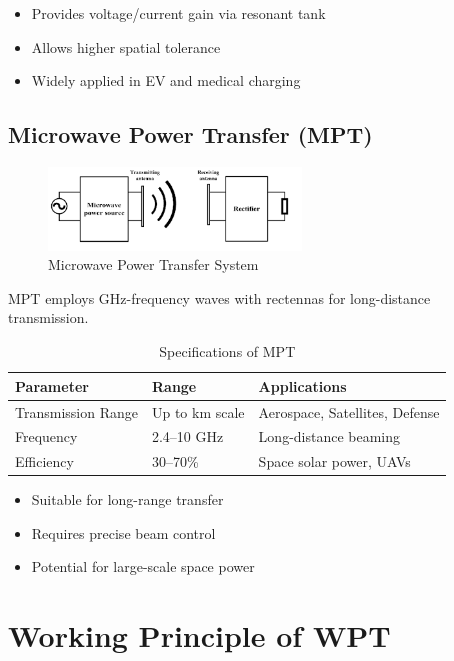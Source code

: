 \documentclass[12pt,a4paper]{report}
\begin{document}
\begin{itemize}
    \item Provides voltage/current gain via resonant tank
    \item Allows higher spatial tolerance
    \item Widely applied in EV and medical charging
\end{itemize}

\subsection{Microwave Power Transfer (MPT)}
\begin{figure}[H]
    \centering
    \includegraphics[width=0.6\textwidth]{image3.png}
    \caption{Microwave Power Transfer System}
\end{figure}

MPT employs GHz-frequency waves with rectennas for long-distance transmission.\cite{zhou2025lowpower}

\begin{table}[H]
\centering
\caption{Specifications of MPT}
\begin{tabular}{|p{4cm}|p{5cm}|p{5.2cm}|}
\hline
\textbf{Parameter} & \textbf{Range} & \textbf{Applications} \\
\hline
Transmission Range & Up to km scale & Aerospace, Satellites, Defense \\
\hline
Frequency & 2.4--10 GHz & Long-distance beaming \\
\hline
Efficiency & 30--70\% & Space solar power, UAVs \\
\hline
\end{tabular}
\end{table}

\begin{itemize}
    \item Suitable for long-range transfer
    \item Requires precise beam control
    \item Potential for large-scale space power
\end{itemize}

\section{Working Principle of WPT}
\end{document}
